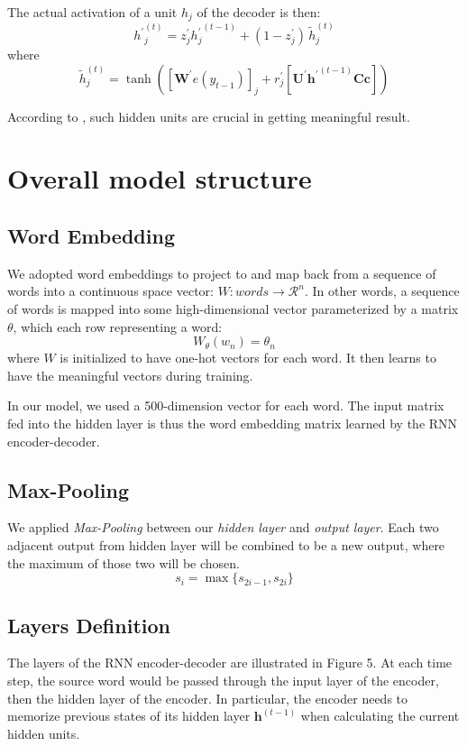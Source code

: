 \documentclass[11pt,letterpaper]{article}
\begin{document}
The actual activation of a unit $h_j$ of the decoder is then:
\begin{equation}
{h^\prime}_j^{(t)} = z_j^\prime {h_j^\prime}^{(t-1)} + (1-z^\prime_j)\, \tilde{h}_j^{(t)}  
\end{equation}
where 
\begin{equation}
\tilde{h}_j^{(t)} = \tanh \left( {[\mathbf{W}^\prime e(y_{t-1})]}_j + r_j^\prime  {[\mathbf{U}^\prime {\mathbf{h}^\prime}^{(t-1)} \mathbf{C} \mathbf{c}]} \right)
\end{equation}

According to \cite{rnn}, such hidden units are crucial in getting meaningful result.

\section{Overall model structure}
\subsection{Word Embedding}
We adopted word embeddings to project to and map back from a sequence of words into a continuous space vector: $W: words \rightarrow \mathcal{R}^n$. In other words, a sequence of words is mapped into some high-dimensional vector parameterized by a matrix $\theta$, which each row representing a word:
\begin{equation}
W_\theta(w_n) = \theta_n
\end{equation}
where $W$ is initialized to have one-hot vectors for each word. It then learns to have the meaningful vectors during training. 

In our model, we used a 500-dimension vector for each word. The input matrix fed into the hidden layer is thus the word embedding matrix learned by the RNN encoder-decoder.

\subsection{Max-Pooling}
We applied \textit{Max-Pooling} between our \textit{hidden layer} and \textit{output layer}. Each two adjacent output from hidden layer will be combined to be a new output, where the maximum of those two will be chosen.
\begin{equation}
s_i = \max \{s_{2i-1}, s_{2i} \}
\end{equation}

\subsection{Layers Definition}
The layers of the RNN encoder-decoder are illustrated in Figure 5. At each time step, the source word would be passed through the input layer of the encoder, then the hidden layer of the encoder. In particular, the encoder needs to memorize previous states of its hidden layer $\mathbf{h}^{(t-1)}$ when calculating the current hidden units. 
\end{document}
